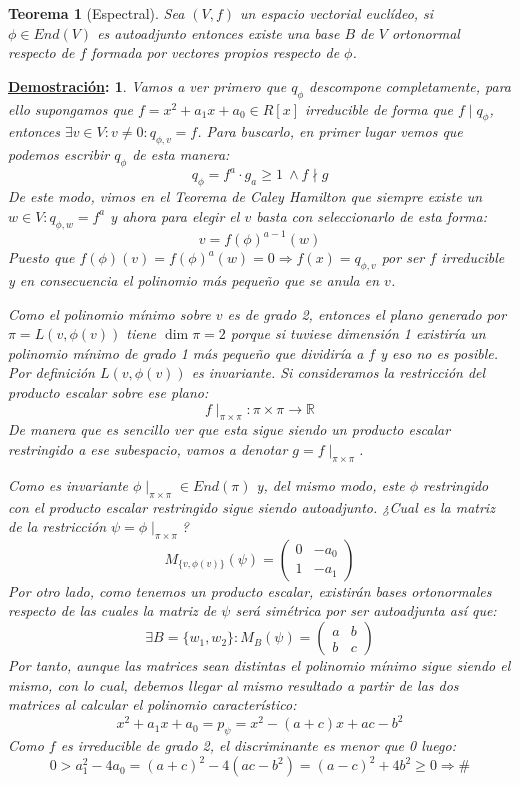 \documentclass[10pt,a4paper,openright]{book}
\theoremstyle{break}
\newtheorem*{theo}{Teorema}
\newtheorem*{demo}{\underline{Demostración}:}
\begin{document}
\begin{theo}[Espectral]
Sea $(V,f)$ un espacio vectorial euclídeo, si $\phi\in End(V)$ es autoadjunto entonces existe una base $B$ de $V$ ortonormal respecto de $f$ formada por vectores propios respecto de $\phi$.
\end{theo}
\begin{demo}
Vamos a ver primero que $q_\phi$ descompone completamente, para ello supongamos que $f = x^2+a_1x+a_0\in R[x]$ irreducible de forma que $f\mid q_\phi$, entonces $\exists v\in V: v\neq 0: q_{\phi,v} = f$. Para buscarlo, en primer lugar vemos que podemos escribir $q_\phi$ de esta manera:
$$q_\phi = f^a \cdot g_ a\geq 1 \ \wedge f\nmid g$$
De este modo, vimos en el Teorema de Caley Hamilton que siempre existe un $w\in V: q_{\phi, w} = f^a$ y ahora para elegir el $v$ basta con seleccionarlo de esta forma:
$$v= f(\phi)^{a-1}(w)$$
Puesto que $f(\phi)(v) = f(\phi)^a(w) = 0\Rightarrow f(x) = q_{\phi,v}$ por ser $f$ irreducible y en consecuencia el polinomio más pequeño que se anula en $v$.

Como el polinomio mínimo sobre $v$ es de grado 2, entonces el plano generado por $\pi = L(v,\phi(v))$ tiene $\dim \pi = 2$ porque si tuviese dimensión 1 existiría un polinomio mínimo de grado 1 más pequeño que dividiría a $f$ y eso no es posible. Por definición $L(v,\phi(v))$ es invariante. Si consideramos la restricción del producto escalar sobre ese plano:
$$f\mid_{\pi\times \pi}: \pi \times \pi \rightarrow \mathbb R$$
De manera que es sencillo ver que esta sigue siendo un producto escalar restringido a ese subespacio, vamos a denotar $g=f\mid_{\pi \times \pi}$.

Como es invariante $\phi\mid_{\pi\times\pi}\in End(\pi)$ y, del mismo modo, este $\phi$ restringido con el producto escalar restringido sigue siendo autoadjunto. ¿Cual es la matriz de la restricción $\psi = \phi\mid_{\pi \times \pi}$?
$$M_{\{v,\phi(v)\}}(\psi) = \begin{pmatrix} 0 & -a_0 \\ 1 & -a_1\end{pmatrix}$$
Por otro lado, como tenemos un producto escalar, existirán bases ortonormales respecto de las cuales la matriz de $\psi$ será simétrica por ser autoadjunta así que:
$$\exists B = \{w_1, w_2\}: M_B(\psi) = \begin{pmatrix}a & b \\ b & c\end{pmatrix}$$
Por tanto, aunque las matrices sean distintas el polinomio mínimo sigue siendo el mismo, con lo cual, debemos llegar al mismo resultado a partir de las dos matrices al calcular el polinomio característico:
$$x^2+a_1x+a_0 = p_\psi = x^2-(a+c)x+ac-b^2$$
Como $f$ es irreducible de grado 2, el discriminante es menor que 0 luego:
$$ 0 > a_1^2-4a_0 = (a+c)^2-4(ac-b^2) = (a-c)^2+4b^2 \geq 0 \Rightarrow \#$$


\end{demo}
\end{document}

